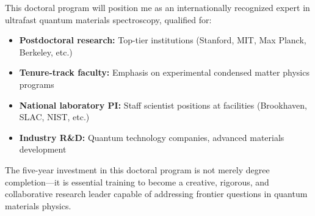 \documentclass[12pt,a4paper]{article}
\begin{document}
This doctoral program will position me as an internationally recognized expert in ultrafast quantum materials spectroscopy, qualified for:
\begin{itemize}
    \item \textbf{Postdoctoral research:} Top-tier institutions (Stanford, MIT, Max Planck, Berkeley, etc.)
    \item \textbf{Tenure-track faculty:} Emphasis on experimental condensed matter physics programs
    \item \textbf{National laboratory PI:} Staff scientist positions at facilities (Brookhaven, SLAC, NIST, etc.)
    \item \textbf{Industry R\&D:} Quantum technology companies, advanced materials development
\end{itemize}

The five-year investment in this doctoral program is not merely degree completion—it is essential training to become a creative, rigorous, and collaborative research leader capable of addressing frontier questions in quantum materials physics.

\newpage
\printbibliography
\end{document}
